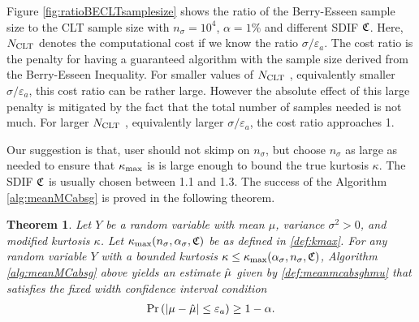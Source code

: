 \documentclass{iitthesis}
\newtheorem{theorem}{Theorem}[section]
\theoremstyle{definition}
\begin{document}
Figure \ref{fig:ratioBECLTsamplesize} shows the ratio of the Berry-Esseen sample size to the CLT sample size with 
$n_\sigma = 10^4$, $\alpha = 1\%$ and different SDIF $\mathfrak{C}$. Here, $N_{\operatorname{CLT}}$ denotes the computational cost if we know the ratio $\sigma/\varepsilon_a$. The cost ratio is the penalty for having a guaranteed algorithm with the sample size derived from the Berry-Esseen Inequality. For smaller values of $N_{\operatorname{CLT}}$ , equivalently smaller $\sigma/\varepsilon_a$, this cost ratio can be rather large. However the absolute effect of this large penalty is mitigated by the fact that the total number of samples needed is not much. For larger $N_{\operatorname{CLT}}$ , equivalently larger $\sigma/\varepsilon_a$,  the cost ratio approaches 1. 

Our suggestion is that, user should not skimp on $n_\sigma$, but choose $n_\sigma$ as large as needed to ensure that $\kappa_{\max}$ is is large enough to bound the true kurtosis $\kappa$. The SDIF $\mathfrak{C}$ is usually chosen between 1.1 and 1.3. The success of the Algorithm \ref{alg:meanMCabsg} is proved in the following theorem.
\begin{theorem} \cite[Theorem 5]{HJLO12}\label{thm:meanMCabsg}
Let $Y$ be a random variable with mean $\mu$, variance $\sigma^2 >0$, and modified kurtosis $\kappa$. Let $\kappa_{\max}(n_\sigma,\alpha_\sigma,\mathfrak{C})$ be as defined in \eqref{def:kmax}. For any random variable $Y$ with a bounded kurtosis $\kappa\leq\kappa_{\max}(\alpha_{\sigma},n_{\sigma},\mathfrak{C})$, Algorithm \ref{alg:meanMCabsg} above yields an estimate $\hat{\mu}$ given by \eqref{def:meanmcabsghmu} that satisfies the fixed width confidence interval condition
\begin{align}
\Pr\left( \left \lvert \mu-\hat{\mu} \right \rvert \leq \varepsilon_a \right) \geq 1-\alpha.
\end{align}
\end{theorem}
\end{document}
